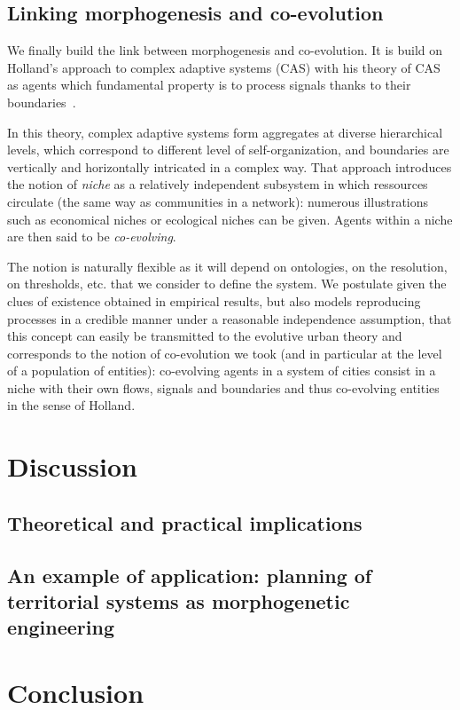 \documentclass[letterpaper]{article}
\begin{document}
\subsection{Linking morphogenesis and co-evolution}


We finally build the link between morphogenesis and co-evolution. It is build on Holland's approach to complex adaptive systems (CAS) with his theory of CAS as agents which fundamental property is to process signals thanks to their boundaries~\cite{holland2012signals}.


In this theory, complex adaptive systems form aggregates at diverse hierarchical levels, which correspond to different level of self-organization, and boundaries are vertically and horizontally intricated in a complex way. That approach introduces the notion of \emph{niche} as a relatively independent subsystem in which ressources circulate (the same way as communities in a network): numerous illustrations such as economical niches or ecological niches can be given. Agents within a niche are then said to be \emph{co-evolving}.



The notion is naturally flexible as it will depend on ontologies, on the resolution, on thresholds, etc. that we consider to define the system. We postulate given the clues of existence obtained in empirical results, but also models reproducing processes in a credible manner under a reasonable independence assumption, that this concept can easily be transmitted to the evolutive urban theory and corresponds to the notion of co-evolution we took (and in particular at the level of a population of entities): co-evolving agents in a system of cities consist in a niche with their own flows, signals and boundaries and thus co-evolving entities in the sense of Holland.




\section{Discussion}


\subsection{Theoretical and practical implications}





\subsection{An example of application: planning of territorial systems as morphogenetic engineering}








\section{Conclusion}









\footnotesize

\end{document}
